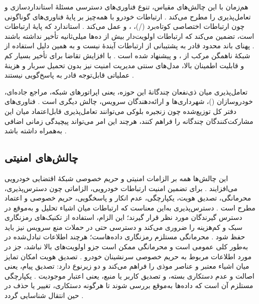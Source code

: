 \documentclass[12pt,a4paper]{article}
\begin{document}
هم‌زمان با این چالش‌های مقیاس، تنوع فناوری‌های دسترسی مسئلهٔ استانداردسازی و تعامل‌پذیری را مطرح می‌کند \cite{farsimadanReviewSecurityChallenges2025}. ارتباطات خودرو با همه‌چیز  بر پایهٔ فناوری‌های گوناگونی چون ارتباطات اختصاصی کوتاه‌برد (/)، ،  و  عمل می‌کند \cite{farsimadanReviewSecurityChallenges2025}. استاندارد  که پایهٔ ارتباطات  است، تضمین می‌کند که ارتباطات اولویت‌دار بیش از ده‌ها میلی‌ثانیه تأخیر نداشته باشند \cite{farsimadanReviewSecurityChallenges2025}. پهنای باند محدود  قادر به پشتیبانی از ارتباطات آیندهٔ  نیست \cite{farsimadanReviewSecurityChallenges2025} و به همین دلیل استفاده از شبکهٔ ناهمگن  مرکب از ،  و  پیشنهاد شده است \cite{farsimadanReviewSecurityChallenges2025}. با افزایش تقاضا برای تأخیر بسیار کم و قابلیت اطمینان بالا، مدل‌های سنتی مدیریت امنیت نیز بدون تحمیل سربار و هزینهٔ عملیاتی قابل‌توجه قادر به پاسخ‌گویی نیستند \cite{farsimadanReviewSecurityChallenges2025}.

تعامل‌پذیری میان ذی‌نفعان چندگانهٔ این حوزه، یعنی اپراتور‌های شبکه، مراجع جاده‌ای، خودروسازان ()، شهرداری‌ها و ارائه‌دهندگان سرویس، چالش دیگری است \cite{farsimadanReviewSecurityChallenges2025}. فناوری‌های دفتر کل توزیع‌شده چون زنجیره بلوکی می‌توانند تعامل‌پذیری قابل‌اعتماد میان این مشارکت‌کنندگان چندگانه را فراهم کنند، هرچند این امر می‌تواند پیچیدگی زمانی اضافی به‌همراه داشته باشد \cite{farsimadanReviewSecurityChallenges2025}.

\subsection{چالش‌های امنیتی}

این چالش‌ها همه بر الزامات امنیتی و حریم خصوصی شبکهٔ اقتضایی خودرویی می‌افزایند \cite{farsimadanReviewSecurityChallenges2025, VanetSecurityPrivacy}. برای تضمین امنیت ارتباطات خودرویی، الزاماتی چون دسترس‌پذیری، محرمانگی، تصدیق هویت، یکپارچگی، عدم انکار و پاسخگویی، حریم خصوصی و اعتماد مطرح است \cite{farsimadanReviewSecurityChallenges2025, VanetSecurityPrivacy}. دسترس‌پذیری  به‌این معناست که ارتباطات میان اشیاء  تحلیل و به‌موقع در دسترس گیرندگان مورد نظر قرار گیرند؛ این الزام، استفاده از تکنیک‌های رمزنگاری سبک و کم‌هزینه را ضروری می‌کند و دسترسی حتی در حملات منع سرویس  نیز باید حفظ شود \cite{farsimadanReviewSecurityChallenges2025}. محرمانگی  مستلزم رمزنگاری داده‌هاست؛ هرچند اطلاعات تبادل‌شده در  به‌طور کلی عمومی است و محرمانگی ممکن است جزو اولویت‌های بالا نباشد، جز در مورد اطلاعات مربوط به حریم خصوصی سرنشینان خودرو \cite{farsimadanReviewSecurityChallenges2025}. تصدیق هویت  امکان تمایز میان اشیاء معتبر و عناصر موذی را فراهم می‌کند و دو زیرنوع دارد: تصدیق پیام، یعنی اصالت و عدم دستکاری بسته، و تصدیق کاربر یا منبع، یعنی اعتبار موجودیت \cite{farsimadanReviewSecurityChallenges2025}. یکپارچگی  مستلزم آن است که داده‌ها به‌موقع بررسی شوند تا هرگونه دستکاری، تغییر یا حذف در حین انتقال شناسایی گردد \cite{farsimadanReviewSecurityChallenges2025}.
\end{document}
